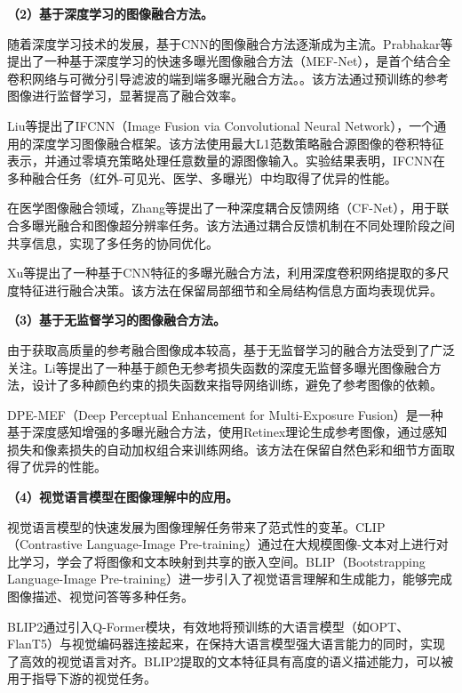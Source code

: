 \textbf{（2）基于深度学习的图像融合方法。}

随着深度学习技术的发展，基于CNN的图像融合方法逐渐成为主流。Prabhakar等\supercite{prabhakar2020deep}提出了一种基于深度学习的快速多曝光图像融合方法（MEF-Net），是首个结合全卷积网络与可微分引导滤波的端到端多曝光融合方法。。该方法通过预训练的参考图像进行监督学习，显著提高了融合效率。

Liu等\supercite{liu2020ifcnn}提出了IFCNN（Image Fusion via Convolutional Neural Network），一个通用的深度学习图像融合框架。该方法使用最大L1范数策略融合源图像的卷积特征表示，并通过零填充策略处理任意数量的源图像输入。实验结果表明，IFCNN在多种融合任务（红外-可见光、医学、多曝光）中均取得了优异的性能。

在医学图像融合领域，Zhang等\supercite{zhang2021fusion}提出了一种深度耦合反馈网络（CF-Net），用于联合多曝光融合和图像超分辨率任务。该方法通过耦合反馈机制在不同处理阶段之间共享信息，实现了多任务的协同优化。

Xu等\supercite{xu2020cnn}提出了一种基于CNN特征的多曝光融合方法，利用深度卷积网络提取的多尺度特征进行融合决策。该方法在保留局部细节和全局结构信息方面均表现优异。

\textbf{（3）基于无监督学习的图像融合方法。}

由于获取高质量的参考融合图像成本较高，基于无监督学习的融合方法受到了广泛关注。Li等\supercite{li2022unsupervised}提出了一种基于颜色无参考损失函数的深度无监督多曝光图像融合方法，设计了多种颜色约束的损失函数来指导网络训练，避免了参考图像的依赖。

DPE-MEF（Deep Perceptual Enhancement for Multi-Exposure Fusion）\supercite{xu2022dpe}是一种基于深度感知增强的多曝光融合方法，使用Retinex理论生成参考图像，通过感知损失和像素损失的自动加权组合来训练网络。该方法在保留自然色彩和细节方面取得了优异的性能。

\textbf{（4）视觉语言模型在图像理解中的应用。}

视觉语言模型的快速发展为图像理解任务带来了范式性的变革。CLIP（Contrastive Language-Image Pre-training）\supercite{radford2021clip}通过在大规模图像-文本对上进行对比学习，学会了将图像和文本映射到共享的嵌入空间。BLIP（Bootstrapping Language-Image Pre-training）进一步引入了视觉语言理解和生成能力，能够完成图像描述、视觉问答等多种任务。

BLIP2\supercite{li2023blip2}通过引入Q-Former模块，有效地将预训练的大语言模型（如OPT、FlanT5）与视觉编码器连接起来，在保持大语言模型强大语言能力的同时，实现了高效的视觉语言对齐。BLIP2提取的文本特征具有高度的语义描述能力，可以被用于指导下游的视觉任务。

